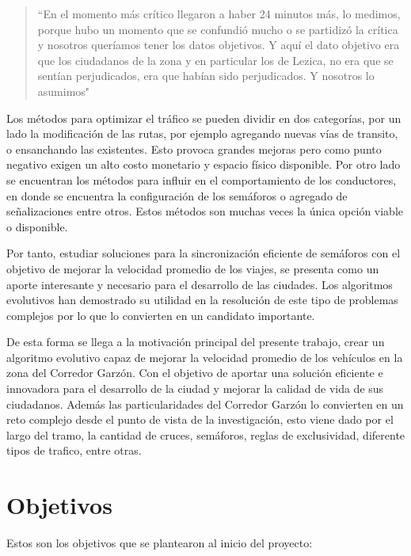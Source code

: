 \begin{quote}\small
	``En el momento más crítico llegaron a haber 24 minutos más, lo medimos, porque hubo un momento que se confundió mucho o se partidizó la crítica y nosotros queríamos tener los datos objetivos. Y aquí el dato objetivo era que los ciudadanos de la zona y en particular los de Lezica, no era que se sentían perjudicados, era que habían sido perjudicados. Y nosotros lo asumimos"
\end{quote}

Los métodos para optimizar el tráfico se pueden dividir en dos categorías, por un lado la modificación de las rutas, por ejemplo agregando nuevas vías de transito, o ensanchando las existentes. Esto provoca grandes mejoras pero como punto negativo exigen un alto costo monetario y espacio físico disponible. Por otro lado se encuentran los métodos para influir en el comportamiento de los conductores, en donde se encuentra la configuración de los semáforos o agregado de señalizaciones entre otros. Estos métodos son muchas veces la única opción viable o disponible.

Por tanto, estudiar soluciones para la sincronización eficiente de semáforos con el objetivo de mejorar la velocidad promedio de los viajes, se presenta como un aporte interesante y necesario para el desarrollo de las ciudades. Los algoritmos evolutivos han demostrado su utilidad en la resolución de este tipo de problemas complejos por lo que lo convierten en un candidato importante.

De esta forma se llega a la motivación principal del presente trabajo, crear un algoritmo evolutivo capaz de mejorar la velocidad promedio de los vehículos en la zona del Corredor Garzón. Con el objetivo de aportar una solución eficiente e innovadora para el desarrollo de la ciudad y mejorar la calidad de vida de sus ciudadanos. Además las particularidades del Corredor Garzón lo convierten en un reto complejo desde el punto de vista de la investigación, esto viene dado por el largo del tramo, la cantidad de cruces, semáforos, reglas de exclusividad, diferente tipos de trafico, entre otras.



\section{Objetivos}

Estos son los objetivos que se plantearon al inicio del proyecto:

